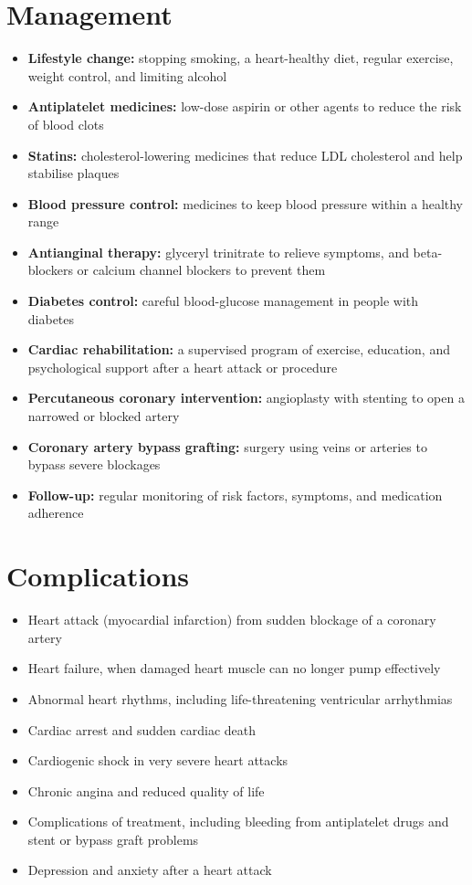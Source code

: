 \section*{Management}
\begin{itemize}
    \item \textbf{Lifestyle change:} stopping smoking, a heart-healthy diet, regular exercise, weight control, and limiting alcohol
    \item \textbf{Antiplatelet medicines:} low-dose aspirin or other agents to reduce the risk of blood clots
    \item \textbf{Statins:} cholesterol-lowering medicines that reduce LDL cholesterol and help stabilise plaques
    \item \textbf{Blood pressure control:} medicines to keep blood pressure within a healthy range
    \item \textbf{Antianginal therapy:} glyceryl trinitrate to relieve symptoms, and beta-blockers or calcium channel blockers to prevent them
    \item \textbf{Diabetes control:} careful blood-glucose management in people with diabetes
    \item \textbf{Cardiac rehabilitation:} a supervised program of exercise, education, and psychological support after a heart attack or procedure
    \item \textbf{Percutaneous coronary intervention:} angioplasty with stenting to open a narrowed or blocked artery
    \item \textbf{Coronary artery bypass grafting:} surgery using veins or arteries to bypass severe blockages
    \item \textbf{Follow-up:} regular monitoring of risk factors, symptoms, and medication adherence
\end{itemize}

\section*{Complications}
\begin{itemize}
    \item Heart attack (myocardial infarction) from sudden blockage of a coronary artery
    \item Heart failure, when damaged heart muscle can no longer pump effectively
    \item Abnormal heart rhythms, including life-threatening ventricular arrhythmias
    \item Cardiac arrest and sudden cardiac death
    \item Cardiogenic shock in very severe heart attacks
    \item Chronic angina and reduced quality of life
    \item Complications of treatment, including bleeding from antiplatelet drugs and stent or bypass graft problems
    \item Depression and anxiety after a heart attack
\end{itemize}

